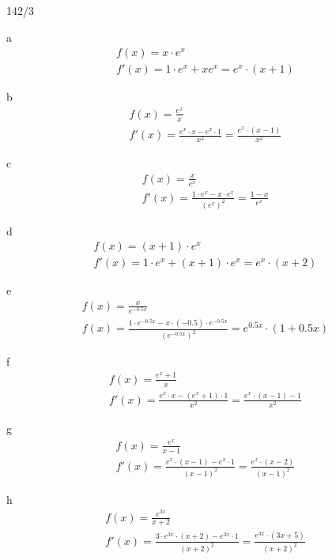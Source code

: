 \begin{exercise}{142/3}
  \item [a]
  \begin{gather*}
    f(x) = x \cdot e^x \\
    f'(x) = 1 \cdot e^x + xe^x = e^x \cdot (x + 1)
  \end{gather*}
  \item [b]
  \begin{gather*}
    f(x) = \frac{e^x}{x} \\
    f'(x) = \frac{e^x \cdot x - e^x \cdot 1}{x^2} = \frac{e^x \cdot (x - 1)}{x^2}
  \end{gather*}
  \item [c]
  \begin{gather*}
    f(x) = \frac{x}{e^x} \\
    f'(x) = \frac{1 \cdot e^x - x \cdot e^x}{(e^x)^2} = \frac{1 - x}{e^x}
  \end{gather*}
  \item [d]
  \begin{gather*}
    f(x) = (x + 1) \cdot e^x \\
    f'(x) = 1 \cdot e^x + (x + 1) \cdot e^x = e^x \cdot (x + 2)
  \end{gather*}
  \item [e]
  \begin{gather*}
    f(x) = \frac{x}{e^{-0.5x}} \\
    f(x) = \frac{1 \cdot e^{-0.5x} - x \cdot (-0.5) \cdot e^{-0.5x}}{(e^{-0.5x})^2} = e^{0.5x} \cdot (1 + 0.5x)
  \end{gather*}
  \item [f]
  \begin{gather*}
    f(x) = \frac{e^x + 1}{x} \\
    f'(x) = \frac{e^x \cdot x - (e^x + 1) \cdot 1}{x^2} = \frac{e^x \cdot (x - 1) - 1}{x^2}
  \end{gather*}
  \item [g]
  \begin{gather*}
    f(x) = \frac{e^x}{x - 1} \\
    f'(x) = \frac{e^x \cdot (x - 1) - e^x \cdot 1}{(x - 1)^2} = \frac{e^x \cdot (x - 2)}{(x - 1)^2}
  \end{gather*}
  \item [h]
  \begin{gather*}
    f(x) = \frac{e^{3x}}{x + 2} \\
    f'(x) = \frac{3 \cdot e^{3x} \cdot (x + 2) - e^{3x} \cdot 1}{(x + 2)^2} = \frac{e^{3x} \cdot (3x + 5)}{(x + 2)^2}
  \end{gather*}

\end{exercise}
